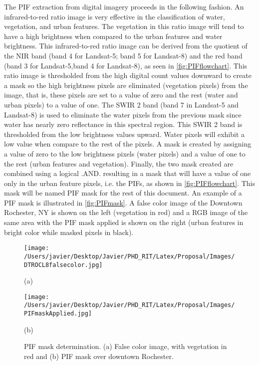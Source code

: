 The PIF extraction from digital imagery proceeds in the following fashion. An infrared-to-red ratio image is very effective in the classification of water, vegetation, and urban features. The vegetation in this ratio image will tend to have a high brightness when compared to the urban features and water brightness. This infrared-to-red ratio image can be derived from the quotient of the NIR band (band 4 for Landsat-5; band 5 for Landsat-8) and the red band (band 3 for Landsat-5,band 4 for Landsat-8), as seen in \autoref{fig:PIFflowchart}. This ratio image is thresholded from the high digital count values downward to create a mask so the high brightness pixels are eliminated (vegetation pixels) from the image, that is, these pixels are set to a value of zero and the rest (water and urban pixels) to a value of one. The SWIR 2 band (band 7 in Landsat-5 and Landsat-8) is used to eliminate the water pixels from the previous mask since water has nearly zero reflectance in this spectral region. This SWIR 2 band is thresholded from the low brightness values upward. Water pixels will exhibit a low value when compare to the rest of the pixels. A mask is created by assigning a value of zero to the low brightness pixels (water pixels) and a value of one to the rest (urban features and vegetation). Finally, the two mask created are combined using a logical .AND. resulting in a mask that will have a value of one only in the urban feature pixels, i.e. the PIFs, as shown in \autoref{fig:PIFflowchart}. This mask will be named PIF mask for the rest of this document. An example of a PIF mask is illustrated in \autoref{fig:PIFmask}. A false color image of the Downtown Rochester, NY is shown on the left (vegetation in red) and a RGB image of the same area with the PIF mask applied is shown on the right (urban features in bright color while masked pixels in black).

\begin{figure}[htb]
  \begin{minipage}[c]{0.48\linewidth}
    \centering
      \texttt{[image: /Users/javier/Desktop/Javier/PHD\_RIT/Latex/Proposal/Images/DTROCL8falsecolor.jpg]}  
    \centerline{(a)}\medskip
  \end{minipage}
  \hfill
  \begin{minipage}[d]{0.48\linewidth}
    \centering
      \texttt{[image: /Users/javier/Desktop/Javier/PHD\_RIT/Latex/Proposal/Images/PIFmaskApplied.jpg]}
    \centerline{(b)}\medskip
  \end{minipage}
  \caption{PIF mask determination. (a) False color image, with vegetation in red and (b) PIF mask over downtown Rochester. \label{fig:PIFmask} } 
\end{figure}

